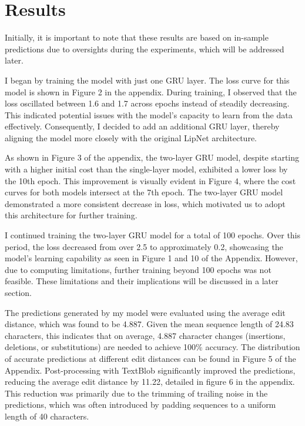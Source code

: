 \documentclass[
]{article}
\begin{document}
\section{Results}\label{results}

Initially, it is important to note that these results are based on
in-sample predictions due to oversights during the experiments, which
will be addressed later.

I began by training the model with just one GRU layer. The loss curve
for this model is shown in Figure 2 in the appendix. During training, I
observed that the loss oscillated between 1.6 and 1.7 across epochs
instead of steadily decreasing. This indicated potential issues with the
model's capacity to learn from the data effectively. Consequently, I
decided to add an additional GRU layer, thereby aligning the model more
closely with the original LipNet architecture.

As shown in Figure 3 of the appendix, the two-layer GRU model, despite
starting with a higher initial cost than the single-layer model,
exhibited a lower loss by the 10th epoch. This improvement is visually
evident in Figure 4, where the cost curves for both models intersect at
the 7th epoch. The two-layer GRU model demonstrated a more consistent
decrease in loss, which motivated us to adopt this architecture for
further training.

I continued training the two-layer GRU model for a total of 100 epochs.
Over this period, the loss decreased from over 2.5 to approximately 0.2,
showcasing the model's learning capability as seen in Figure 1 and 10 of
the Appendix. However, due to computing limitations, further training
beyond 100 epochs was not feasible. These limitations and their
implications will be discussed in a later section.

The predictions generated by my model were evaluated using the average
edit distance, which was found to be 4.887. Given the mean sequence
length of 24.83 characters, this indicates that on average, 4.887
character changes (insertions, deletions, or substitutions) are needed
to achieve 100\% accuracy. The distribution of accurate predictions at
different edit distances can be found in Figure 5 of the Appendix.
Post-processing with TextBlob significantly improved the predictions,
reducing the average edit distance by 11.22, detailed in figure 6 in the
appendix. This reduction was primarily due to the trimming of trailing
noise in the predictions, which was often introduced by padding
sequences to a uniform length of 40 characters.
\end{document}
